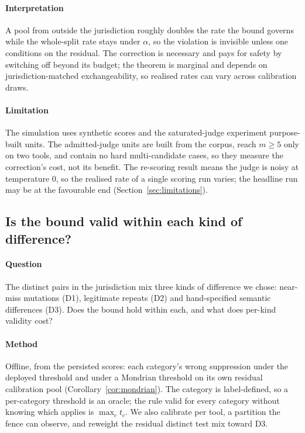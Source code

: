 

\paragraph{Interpretation} A pool from outside the jurisdiction roughly doubles the rate the bound governs while the whole-split rate stays under $\alpha$, so the violation is invisible unless one conditions on the residual. The correction is necessary and pays for safety by switching off beyond its budget; the theorem is marginal and depends on jurisdiction-matched exchangeability, so realised rates can vary across calibration draws.

\paragraph{Limitation} The simulation uses synthetic scores and the saturated-judge experiment purpose-built units. The admitted-judge units are built from the corpus, reach $m\ge5$ only on two tools, and contain no hard multi-candidate cases, so they measure the correction's cost, not its benefit. The re-scoring result means the judge is noisy at temperature 0, so the realised rate of a single scoring run varies; the headline run may be at the favourable end (Section~\ref{sec:limitations}).

\subsection{Is the bound valid within each kind of difference?}\label{sec:res-class}

\paragraph{Question} The distinct pairs in the jurisdiction mix three kinds of difference we chose: near-miss mutations (D1), legitimate repeats (D2) and hand-specified semantic differences (D3). Does the bound hold within each, and what does per-kind validity cost?

\paragraph{Method} Offline, from the persisted scores: each category's wrong suppression under the deployed threshold and under a Mondrian threshold on its own residual calibration pool (Corollary~\ref{cor:mondrian}). The category is label-defined, so a per-category threshold is an oracle; the rule valid for every category without knowing which applies is $\max_c t_c$. We also calibrate per tool, a partition the fence can observe, and reweight the residual distinct test mix toward D3.

